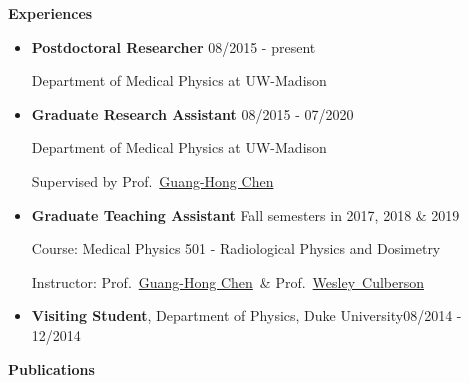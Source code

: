 \documentclass[letterpaper,11pt]{article}
\newcommand{\resheading}[1]{{\large \colorbox{mygrey}{\begin{minipage}{\textwidth}{\textbf{#1 \vphantom{p\^{E}}}}\end{minipage}}}}
\newcommand{\profchen}{Prof.~\href{https://www.medphysics.wisc.edu/blog/staff/chen-guanghong/} {Guang-Hong Chen}}
\newcommand{\profculberson}{Prof.~\href{https://www.medphysics.wisc.edu/blog/staff/culberson-wesley/} {Wesley~Culberson}}
\begin{document}
\resheading{Experiences}
\begin{itemize}
\item \textbf{Postdoctoral Researcher}\cftdotfill{\cftdotsep} 08/2015 - present

Department of Medical Physics at UW-Madison

\item \textbf{Graduate Research Assistant}\cftdotfill{\cftdotsep} 08/2015 - 07/2020

Department of Medical Physics at UW-Madison

Supervised by \profchen
\item \textbf{Graduate Teaching Assistant} \cftdotfill{\cftdotsep} Fall semesters in 2017,  2018 \& 2019

Course: Medical Physics 501 - Radiological Physics and Dosimetry

Instructor: \profchen~\& \profculberson
	 \item \textbf{Visiting Student}, Department of Physics, Duke University\cftdotfill{\cftdotsep}08/2014 - 12/2014
\end{itemize}
\resheading{Publications}
\end{document}
